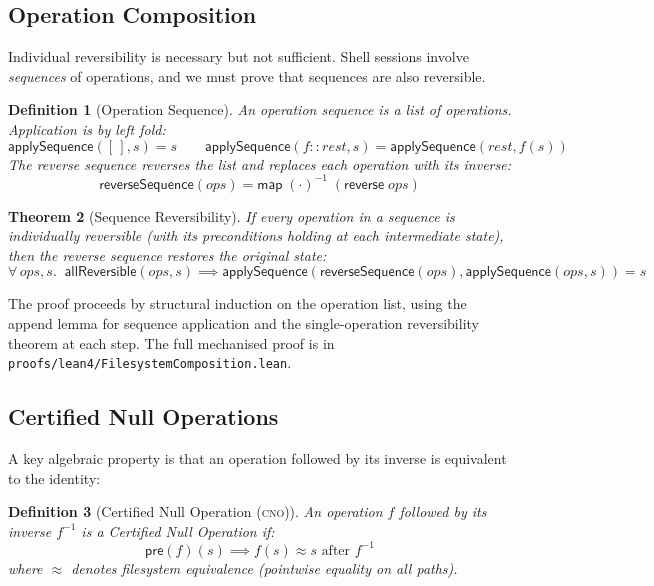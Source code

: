\documentclass[11pt,a4paper]{article}
\newtheorem{theorem}{Theorem}[section]
\newtheorem{definition}[theorem]{Definition}
\newcommand{\inv}[1]{#1^{-1}}
\newcommand{\pre}[1]{\mathsf{pre}(#1)}
\newcommand{\cno}{\textsc{cno}}
\begin{document}
\subsection{Operation Composition}

Individual reversibility is necessary but not sufficient. Shell sessions involve
\emph{sequences} of operations, and we must prove that sequences are also
reversible.

\begin{definition}[Operation Sequence]
\label{def:sequence}
An \emph{operation sequence} is a list of operations. Application is by
left fold:
\[
  \mathsf{applySequence}([\,], s) = s \qquad
  \mathsf{applySequence}(f :: \mathit{rest}, s) =
    \mathsf{applySequence}(\mathit{rest}, f(s))
\]
The \emph{reverse sequence} reverses the list and replaces each operation with
its inverse:
\[
  \mathsf{reverseSequence}(\mathit{ops}) =
    \mathsf{map}\;\inv{(\cdot)}\;(\mathsf{reverse}\;\mathit{ops})
\]
\end{definition}

\begin{theorem}[Sequence Reversibility]
\label{thm:sequence}
If every operation in a sequence is individually reversible (with its
preconditions holding at each intermediate state), then the reverse sequence
restores the original state:
\[
  \forall\, \mathit{ops}, s.\;\;
  \mathsf{allReversible}(\mathit{ops}, s) \implies
  \mathsf{applySequence}(\mathsf{reverseSequence}(\mathit{ops}),
                          \mathsf{applySequence}(\mathit{ops}, s)) = s
\]
\end{theorem}

The proof proceeds by structural induction on the operation list, using the
append lemma for sequence application and the single-operation reversibility
theorem at each step. The full mechanised proof is in
\texttt{proofs/lean4/FilesystemComposition.lean}.

\subsection{Certified Null Operations}

A key algebraic property is that an operation followed by its inverse is
equivalent to the identity:

\begin{definition}[Certified Null Operation (\cno{})]
\label{def:cno}
An operation $f$ followed by its inverse $\inv{f}$ is a \emph{Certified Null
Operation} if:
\[
  \pre{f}(s) \implies f(s) \approx s \text{ after } \inv{f}
\]
where $\approx$ denotes filesystem equivalence (pointwise equality on all
paths).
\end{definition}
\end{document}
